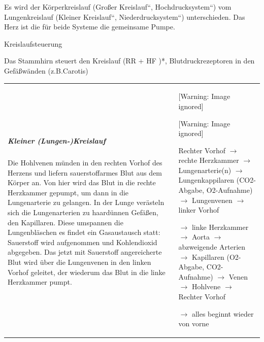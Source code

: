 \documentclass{article}
\begin{document}
Es wird der K\"orperkreislauf ({\quotedblbase}Gro{\ss}er
Kreislauf{\textquotedblleft},
{\quotedblbase}Hochdrucksystem{\textquotedblleft}) vom Lungenkreislauf
({\quotedblbase}Kleiner Kreislauf{\textquotedblleft},
{\quotedblbase}Niederdrucksystem{\textquotedblleft}) unterschieden. Das
Herz ist die f\"ur beide Systeme die gemeinsame Pumpe.

Kreislaufsteuerung

Das Stammhirn  steuert den Kreislauf  (RR + HF )*, Blutdruckrezeptoren
in den  Gef\"a{\ss}w\"anden (z.B.Carotis)

\begin{center}
\begin{tabular}{|m{5.328cm}m{7.977cm}}
\hline
\multicolumn{1}{|m{5.328cm}|}{\subparagraph{Kleiner (Lungen-)Kreislauf}
Die Hohlvenen m\"unden in den rechten Vorhof des Herzens und liefern
sauerstoffarmes Blut aus dem K\"orper an. Von hier wird das Blut in die
rechte Herzkammer gepumpt, um dann in die Lungenarterie zu gelangen. In
der Lunge ver\"asteln sich die Lungenarterien zu haard\"unnen
Gef\"a{\ss}en, den Kapillaren. Diese umspannen die Lungenbl\"aschen es
findet ein Gasaustausch statt: Sauerstoff wird aufgenommen und
Kohlendioxid abgegeben. Das jetzt mit Sauerstoff angereicherte Blut
wird \"uber die Lungenvenen in den linken Vorhof geleitet, der wiederum
das Blut in die linke Herzkammer pumpt. 

} &
\multicolumn{1}{m{7.977cm}|}{

\begin{center}
 [Warning: Image ignored] %

\end{center}
\begin{center}
 [Warning: Image ignored] %

\end{center}
Rechter Vorhof ${\rightarrow}$ rechte Herzkammer ${\rightarrow}$
Lungenarterie(n) ${\rightarrow}$ Lungenkappilaren (CO2-Abgabe,
O2-Aufnahme) ${\rightarrow}$ Lungenvenen ${\rightarrow}$ linker Vorhof 

${\rightarrow}$ linke Herzkammer ${\rightarrow}$ Aorta ${\rightarrow}$
abzweigende Arterien ${\rightarrow}$ Kapillaren (O2-Abgabe,
CO2-Aufnahme)  ${\rightarrow}$ Venen ${\rightarrow}$ Hohlvene
${\rightarrow}$ Rechter Vorhof

 ${\rightarrow}$ alles beginnt wieder von vorne

}
\end{tabular}
\end{center}
\end{document}
